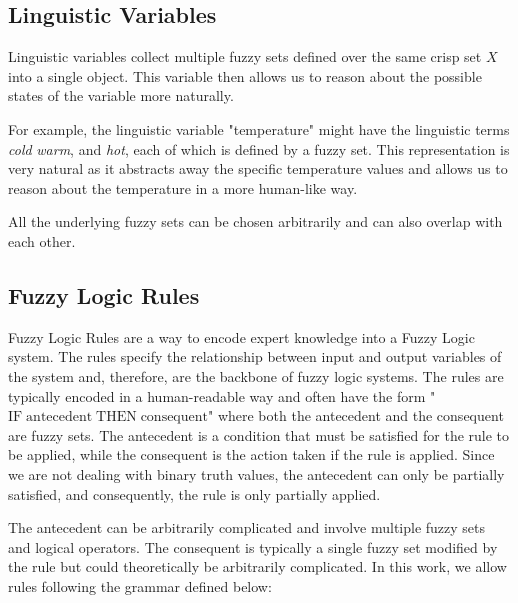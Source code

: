 
\subsection{Linguistic Variables}

Linguistic variables collect multiple fuzzy sets defined over the same crisp set $X$ into a single object. This variable then allows us to reason about the possible states of the variable more naturally.

For example, the linguistic variable "temperature" might have the linguistic terms \emph{cold} \emph{warm}, and \emph{hot}, each of which is defined by a fuzzy set. This representation is very natural as it abstracts away the specific temperature values and allows us to reason about the temperature in a more human-like way.

All the underlying fuzzy sets can be chosen arbitrarily and can also overlap with each other.


\subsection{Fuzzy Logic Rules}

Fuzzy Logic Rules are a way to encode expert knowledge into a Fuzzy Logic system. The rules specify the relationship between input and output variables of the system and, therefore, are the backbone of fuzzy logic systems.
The rules are typically encoded in a human-readable way and often have the form "$\text{IF} \; \text{antecedent} \; \text{THEN} \; \text{consequent}$" where both the antecedent and the consequent are fuzzy sets. The antecedent is a condition that must be satisfied for the rule to be applied, while the consequent is the action taken if the rule is applied. Since we are not dealing with binary truth values, the antecedent can only be partially satisfied, and consequently, the rule is only partially applied.

The antecedent can be arbitrarily complicated and involve multiple fuzzy sets and logical operators. The consequent is typically a single fuzzy set modified by the rule but could theoretically be arbitrarily complicated. In this work, we allow rules following the grammar defined below:

\newcommand{\fuzzyset}{\langle \text{fuzzy set} \rangle}

